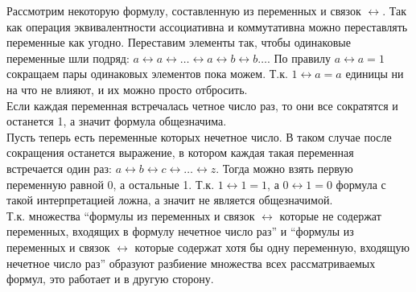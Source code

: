 \documentclass[10pt]{article}
\begin{document}
\begin{enumerate}[i]
Рассмотрим некоторую формулу, составленную из переменных и связок $\leftrightarrow$. Так как операция эквивалентности ассоциативна и коммутативна можно переставлять переменные как угодно. Переставим элементы так, чтобы одинаковые переменные шли подряд: $a \leftrightarrow a \leftrightarrow \ldots \leftrightarrow a \leftrightarrow b \leftrightarrow b \ldots$. По правилу $a \leftrightarrow a = 1$ сокращаем пары одинаковых элементов пока можем. Т.к. $1 \leftrightarrow a = a$ единицы ни на что не влияют, и их можно просто отбросить.\\
Если каждая переменная встречалась четное число раз, то они все сократятся и останется 1, а значит формула общезначима.\\
Пусть теперь есть переменные которых нечетное число. В таком случае после сокращения останется выражение, в котором каждая такая переменная встречается один раз: $ a \leftrightarrow b \leftrightarrow c \leftrightarrow \ldots \leftrightarrow z$. Тогда можно взять первую переменную равной 0, а остальные 1. Т.к. $1 \leftrightarrow 1 = 1$, а $0 \leftrightarrow 1 = 0$ формула с такой интерпретацией ложна, а значит не является общезначимой.\\
Т.к. множества ``формулы из переменных и связок $\leftrightarrow$ которые не содержат переменных, входящих в формулу нечетное число раз'' и ``формулы из переменных и связок $\leftrightarrow$ которые содержат хотя бы одну переменную, входящую нечетное число раз'' образуют разбиение множества всех рассматриваемых формул, это работает и в другую сторону.
\end{enumerate}
\end{document}
